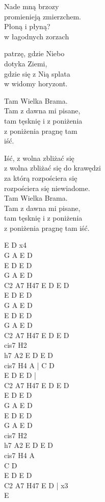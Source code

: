 \begin{textn}
    \chordfill
    Nade mną brzozy\\
    promienieją zmierzchem.\\
    Płoną i płyną?\\
    w łagodnych zorzach

    patrzę, gdzie Niebo\\
    dotyka Ziemi,\\
    gdzie się z Nią splata\\
    w widomy horyzont.

    Tam Wielka Brama.\\
    Tam z dawna mi pisane,\\
    tam tęsknię i z poniżenia\\
    z poniżenia pragnę tam\\
    iść.

    Iść, z wolna zbliżać się\\
    z wolna zbliżać się do krawędzi\\
    za którą rozpościera się\\
    rozpościera się niewiadome.\\
    Tam Wielka Brama.\\
    Tam z dawna mi pisane,\\
    tam tęsknię i z poniżenia\\
    z poniżenia pragnę tam
    iść.
\end{textn}
\begin{chordw}
    E D x4\\
    G A E D\\
    E D E D\\
    G A E D\\
    C2 A7 H47 E D E D\\
    E D E D\\
    G A E D\\
    E D E D\\
    G A E D\\
    C2 A7 H47 E D E D\\
    cis7 H2\\
    h7 A2 E D E D\\
    cis7 H4 A | C D\\
    E D E D	|\\
    C2 A7 H47 E D E D\\
    E D E D\\
    G A E D\\
    E D E D\\
    G A E D\\
    cis7 H2\\
    h7 A2 E D E D\\
    cis7 H4 A\\
    C D\\
    E D E D\\
    C2 A7 H47 E D | x3\\
    E
\end{chordw}